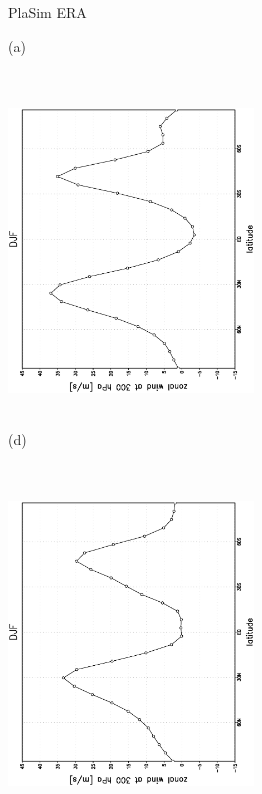 \documentclass[12pt,a4paper,twoside,openright,headinclude,liststotoc,bibtotoc]{scrreprt}
\begin{document}
\begin{appendix}
\begin{figure}[b]
\hspace{4.0cm}PlaSim \vspace{0.2cm} \hspace{7.3cm} ERA \\
\parbox{8.5cm}{\hspace{0.90cm}\begin{scriptsize}(a) \end{scriptsize} \vspace{-0.5cm} \\
\includegraphics[height=8.5cm,width=6.5cm,angle=-90]
{eps/zonysmu_300DJF.eps}
}
\parbox{8.5cm}{\hspace{0.90cm}\begin{scriptsize}(d) \end{scriptsize} \vspace{-0.5cm} \\
\includegraphics[height=8.5cm,width=6.5cm,angle=-90]
{eps/t21zonysmuvel131DJF300.eps}
}
\end{figure}
\end{appendix}
\end{document}
